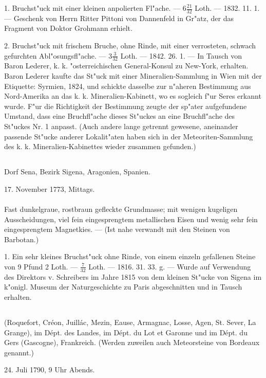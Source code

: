 \documentclass[a4paper, 11pt, oneside, polutonikogreek, german]{article}
\begin{document}
1. Bruchst"uck mit einer kleinen anpolierten Fl"ache. --- $\mathfrak{6\frac{21}{32}}$ Loth. --- 1832. 11. 1. --- Geschenk von Herrn Ritter Pittoni von Dannenfeld in Gr"atz, der das Fragment von Doktor Grohmann erhielt.

2. Bruchst"uck mit frischem Bruche, ohne Rinde, mit einer verrosteten, schwach gefurchten Abl"osungsfl"ache. --- $\mathfrak{3\frac{3}{32}}$ Loth. --- 1842. 26. 1. --- In Tausch von Baron Lederer, k. k. "osterreichischen General-Konsul zu New-York, erhalten. Baron Lederer kaufte das St"uck mit einer Mineralien-Sammlung in Wien mit der Etiquette: Syrmien, 1824, und schickte dasselbe zur n"aheren Bestimmung aus Nord-Amerika an das k. k. Mineralien-Kabinett, wo es sogleich f"ur Seres erkannt wurde. F"ur die Richtigkeit der Bestimmung zeugte der sp"ater aufgefundene Umstand, dass eine Bruchfl"ache dieses St"uckes an eine Bruchfl"ache des St"uckes Nr. 1 anpasst. (Auch andere lange getrennt gewesene, aneinander passende St"ucke anderer Lokalit"aten haben sich in der Meteoriten-Sammlung des k. k. Mineralien-Kabinettes wieder zusammen gefunden.)
\subsection{}
\begin{center}

Dorf Sena, Bezirk Sigena, Aragonien, Spanien.

17. November 1773, Mittags.
\end{center}
\paragraph{}
Fast dunkelgraue, rostbraun gefleckte Grundmasse; mit wenigen kugeligen Ausscheidungen, viel fein eingesprengtem metallischen Eisen und wenig sehr fein eingesprengtem Magnetkies. --- (Ist nahe verwandt mit den Steinen von Barbotan.)

1. Ein sehr kleines Bruchst"uck ohne Rinde, von einem einzeln gefallenen Steine von 9 Pfund 2 Loth. --- $\mathfrak{\frac{7}{32}}$ Loth. --- 1816. 31. 33. g. --- Wurde auf Verwendung des Direktors v. Schreibers im Jahre 1815 von dem kleinen St"ucke von Sigena im k"onigl. Museum der Naturgeschichte zu Paris abgeschnitten und in Tausch erhalten.
\subsection{}
\begin{center}

(Roquefort, Créon, Juillác, Mezin, Eause, Armagnac, Losse, Agen, St. Sever, La Grange), im Dépt. des Landes, im Dépt. du Lot et Garonne und im Dépt. du Gers (Gascogne), Frankreich. (Werden zuweilen auch Meteorsteine von Bordeaux genannt.)

24. Juli 1790, 9 Uhr Abends.
\end{center}
\end{document}

